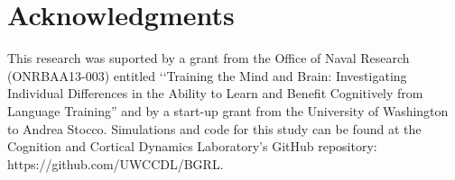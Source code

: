 \documentclass[10pt,letterpaper]{article}
\begin{document}
\section{Acknowledgments}

This research was suported by a grant from the Office of Naval Research (ONRBAA13-003) entitled ‘‘Training the Mind and Brain: Investigating Individual Differences in the Ability to Learn and Benefit Cognitively from Language Training'' and by a start-up grant from the University of Washington to Andrea Stocco. Simulations and code for this study can be found at the Cognition and Cortical Dynamics Laboratory's {\color{red} GitHub} repository: https://github.com/UWCCDL/BGRL.



\setlength{\bibleftmargin}{.125in}
\setlength{\bibindent}{-\bibleftmargin}


\end{document}
